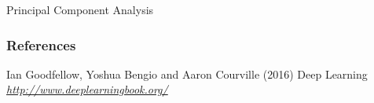 \begin{vbframe}{Principal Component Analysis}
\begin{itemize}
  \end{itemize}
  
\end{vbframe}



\begin{vbframe}
\frametitle{References}
\footnotesize{
\begin{thebibliography}{99}
 Ian Goodfellow, Yoshua Bengio and Aaron Courville (2016)
\newblock Deep Learning
\newblock \emph{\url{http://www.deeplearningbook.org/}}

\end{thebibliography}
}
\end{vbframe}


\endlecture
